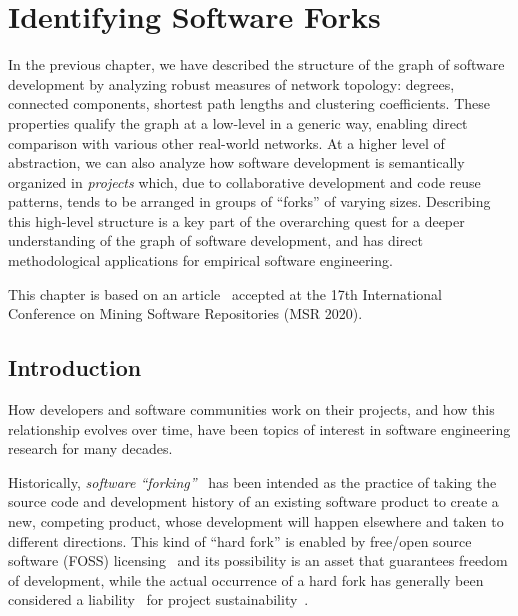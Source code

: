 \chapter{Identifying Software Forks}%
\label{chp:forks}

In the previous chapter, we have described the structure of the graph of
software development by analyzing robust measures of network topology: degrees,
connected components, shortest path lengths and clustering coefficients. These
properties qualify the graph at a low-level in a generic way, enabling direct
comparison with various other real-world networks. At a higher level of
abstraction, we can also analyze how software development is semantically
organized in \emph{projects} which, due to collaborative development and code
reuse patterns, tends to be arranged in groups of ``forks'' of varying sizes.
Describing this high-level structure is a key part of the overarching quest for
a deeper understanding of the graph of software development, and has direct
methodological applications for empirical software engineering.

This chapter is based on an article~\cite{swh-msr2020-forking} accepted at the
17th International Conference on Mining Software Repositories (MSR 2020).

\section{Introduction}%
\label{sec:forks-intro}

How developers and software communities work on their projects, and how this
relationship evolves over time, have been topics of interest in software
engineering research for many decades.

Historically, \emph{software ``forking''}~\cite{nyman2016forkhistory} has been
intended as the practice of taking the source code and development history of
an existing software product to create a new, competing product, whose
development will happen elsewhere and taken to different directions. This kind
of ``hard fork'' is enabled by free/open source software (FOSS)
licensing~\cite{fogel2005producingoss} and its possibility is an asset that
guarantees freedom of development, while the actual occurrence of a hard fork
has generally been considered a liability~\cite{robles2012forks} for project
sustainability~\cite{nyman2011-fork-or-not, nyman2014forking-hackers,
  rastogi2016forking}.


